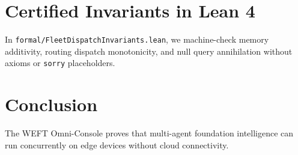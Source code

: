 \documentclass[10pt,twocolumn,letterpaper]{article}
\begin{document}
\section{Certified Invariants in Lean 4}
In \texttt{formal/FleetDispatchInvariants.lean}, we machine-check memory additivity, routing dispatch monotonicity, and null query annihilation without axioms or \texttt{sorry} placeholders.

\section{Conclusion}
The WEFT Omni-Console proves that multi-agent foundation intelligence can run concurrently on edge devices without cloud connectivity.
\end{document}
